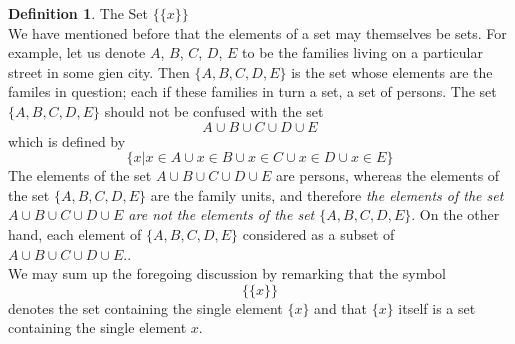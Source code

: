 \documentclass{book}
\theoremstyle{definition}
\newtheorem{definition}{Definition}[section]
\theoremstyle{remark}
\begin{document}
\begin{definition}
The Set $\{ \{ x \}  \}$ \\

We have mentioned before that the elements of a set may themselves be sets. For example, let us denote $A$, $B$, $C$, $D$, $E$ to be the families living on a particular street in some  gien city. Then $\{ A, B, C, D, E \}$ is the set whose elements are the familes in question; each if these families in turn a set, a set of persons. The set $\{ A, B, C, D, E \}$ should not be confused with the set 
    \begin{equation*}
        A \cup B \cup C \cup D \cup E
    \end{equation*}
which is defined by 
    \begin{equation*}
        \{ x | x \in A \cup x \in B \cup x \in C \cup x \in D \cup x \in E \}
    \end{equation*}
The elements of the set $A \cup B \cup C \cup D \cup E$ are persons, whereas the elements of the set $\{ A, B, C, D, E \}$ are the family units, and therefore  \textit{the elements of the set $A \cup B \cup C \cup D \cup E$ are not the elements of the set $\{ A, B, C, D, E \}$}. On the other hand, each element of $\{ A, B, C, D, E \}$ considered as a subset of $A \cup B \cup C \cup D \cup E$.. \\

We may sum up the foregoing discussion by remarking that the symbol 
    \begin{equation*}
        \{ \{ x \} \}
    \end{equation*}
denotes the set containing the single element $\{x\}$ and  that $\{x\}$ itself is a set containing the single element $x$. 
\end{definition}
\end{document}
